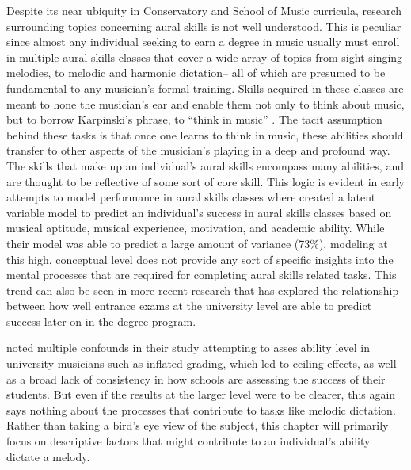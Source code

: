 \documentclass[12pt,]{book}
\begin{document}
Despite its near ubiquity in Conservatory and School of Music curricula, research surrounding topics concerning aural skills is not well understood.
This is peculiar since almost any individual seeking to earn a degree in music usually must enroll in multiple aural skills classes that cover a wide array of topics from sight-singing melodies, to melodic and harmonic dictation-- all of which are presumed to be fundamental to any musician's formal training.
Skills acquired in these classes are meant to hone the musician's ear and enable them not only to think about music, but to borrow Karpinski's phrase, to ``think in music'' \citep[\href{mailto:p.4;@bestMusicCurriculaFuture1992}{\nolinkurl{p.4;@bestMusicCurriculaFuture1992}}]{karpinskiAuralSkillsAcquisition2000}.
The tacit assumption behind these tasks is that once one learns to think in music, these abilities should transfer to other aspects of the musician's playing in a deep and profound way.
The skills that make up an individual's aural skills encompass many abilities, and are thought to be reflective of some sort of core skill.
This logic is evident in early attempts to model performance in aural skills classes where \citet{harrisonEffectsMusicalAptitude1994} created a latent variable model to predict an individual's success in aural skills classes based on musical aptitude, musical experience, motivation, and academic ability.
While their model was able to predict a large amount of variance (73\%), modeling at this high, conceptual level does not provide any sort of specific insights into the mental processes that are required for completing aural skills related tasks.
This trend can also be seen in more recent research that has explored the relationship between how well entrance exams at the university level are able to predict success later on in the degree program.

\citet{wolfGradesReflectDevelopment2014} noted multiple confounds in their study attempting to asses ability level in university musicians such as inflated grading, which led to ceiling effects, as well as a broad lack of consistency in how schools are assessing the success of their students.
But even if the results at the larger level were to be clearer, this again says nothing about the processes that contribute to tasks like melodic dictation.
Rather than taking a bird's eye view of the subject, this chapter will primarily focus on descriptive factors that might contribute to an individual's ability dictate a melody.
\end{document}
